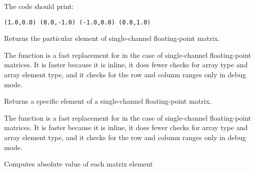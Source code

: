 The code should print:

\begin{lstlisting}
(1.0,0.0) (0.0,-1.0) (-1.0,0.0) (0.0,1.0)
\end{lstlisting}
\fi

Returns the particular element of single-channel floating-point matrix.


\begin{description}
\end{description}

The function is a fast replacement for 
in the case of single-channel floating-point matrices. It is faster because
it is inline, it does fewer checks for array type and array element type,
and it checks for the row and column ranges only in debug mode.

Returns a specific element of a single-channel floating-point matrix.


\begin{description}
\end{description}


The function is a fast replacement for 
in the case of single-channel floating-point matrices. It is faster because
it is inline, it does fewer checks for array type and array element type, 
and it checks for the row and column ranges only in debug mode.

\fi


\ifCpp

Computes absolute value of each matrix element

